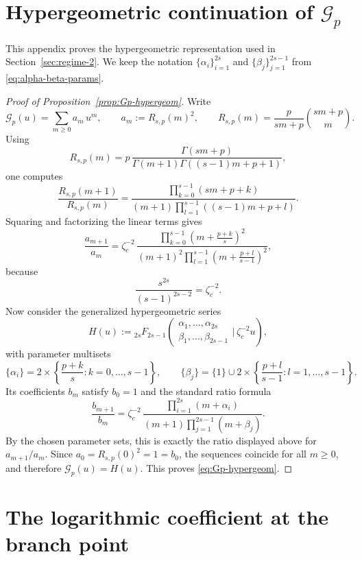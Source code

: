 \documentclass[11pt]{amsart}
\numberwithin{equation}{section}
\theoremstyle{plain}
\theoremstyle{definition}
\theoremstyle{remark}
\begin{document}
\section{Hypergeometric continuation of \texorpdfstring{$\mathcal G_p$}{Gp}}
\label{app:hyp-2}

This appendix proves the hypergeometric representation used in
Section~\ref{sec:regime-2}. We keep the notation
\(\{\alpha_i\}_{i=1}^{2s}\) and \(\{\beta_j\}_{j=1}^{2s-1}\) from
\eqref{eq:alpha-beta-params}.

\begin{proof}[Proof of Proposition~\ref{prop:Gp-hypergeom}]
	Write
	\[
		\mathcal G_p(u)=\sum_{m\ge0} a_m\,u^m,
		\qquad
		a_m:=R_{s,p}(m)^2,
		\qquad
		R_{s,p}(m)=\frac{p}{sm+p}\binom{sm+p}{m}.
	\]
	Using
	\[
		R_{s,p}(m)
		=
		p\,\frac{\Gamma(sm+p)}{\Gamma(m+1)\Gamma((s-1)m+p+1)},
	\]
	one computes
	\[
		\frac{R_{s,p}(m+1)}{R_{s,p}(m)}
		=
		\frac{\prod_{k=0}^{s-1}(sm+p+k)}
		{(m+1)\prod_{l=1}^{s-1}((s-1)m+p+l)}.
	\]
	Squaring and factorizing the linear terms gives
	\[
		\frac{a_{m+1}}{a_m}
		=
		\zeta_c^{-2}\,
		\frac{\prod_{k=0}^{s-1}\left(m+\frac{p+k}{s}\right)^2}
		{(m+1)^2\prod_{l=1}^{s-1}\left(m+\frac{p+l}{s-1}\right)^2},
	\]
	because
	\[
		\frac{s^{2s}}{(s-1)^{2s-2}}=\zeta_c^{-2}.
	\]
	Now consider the generalized hypergeometric series
	\[
		H(u):={}_{2s}F_{2s-1}\!\left(
		\begin{matrix}
			\alpha_1,\ldots,\alpha_{2s} \\
			\beta_1,\ldots,\beta_{2s-1}
		\end{matrix}
		\Big|\, \zeta_c^{-2}u
		\right),
	\]
	with parameter multisets
	\[
		\{\alpha_i\}
		=
		2\times\left\{\frac{p+k}{s}:k=0,\ldots,s-1\right\},
		\qquad
		\{\beta_j\}
		=
		\{1\}\cup
		2\times\left\{\frac{p+l}{s-1}:l=1,\ldots,s-1\right\}.
	\]
	Its coefficients \(b_m\) satisfy \(b_0=1\) and the standard ratio formula
	\[
		\frac{b_{m+1}}{b_m}
		=
		\zeta_c^{-2}\,
		\frac{\prod_{i=1}^{2s}(m+\alpha_i)}
		{(m+1)\prod_{j=1}^{2s-1}(m+\beta_j)}.
	\]
	By the chosen parameter sets, this is exactly the ratio displayed above for
	\(a_{m+1}/a_m\).  Since \(a_0=R_{s,p}(0)^2=1=b_0\), the sequences coincide
	for all \(m\ge0\), and therefore \(\mathcal G_p(u)=H(u)\). This proves
	\eqref{eq:Gp-hypergeom}.
\end{proof}


\section{The logarithmic coefficient at the branch point}
\label{app:B1}
\end{document}
